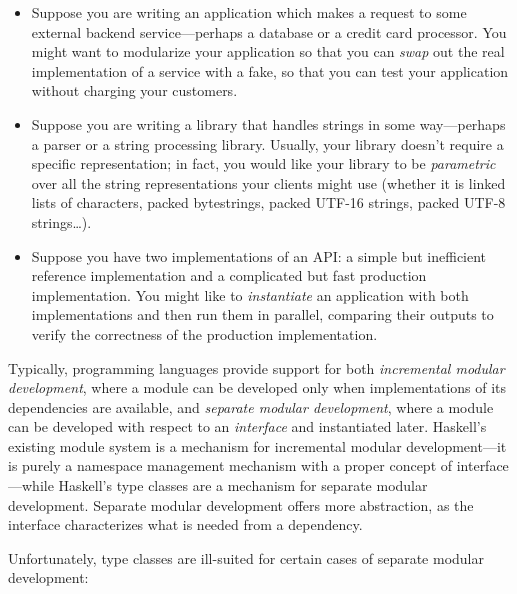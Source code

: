 \begin{itemize}
    \item Suppose you are writing an application which makes a request to
    some external backend service---perhaps a database or a credit card
    processor.  You might want to modularize your
    application so that you can \emph{swap} out the real implementation
    of a service with a fake, so that you can test your application without
    charging your customers.

    \item Suppose you are writing a library that handles strings in some
    way---perhaps a parser or a string processing library.  Usually, your
    library doesn't require a specific representation; in fact, you would
    like your library to be \emph{parametric} over all the string representations
    your clients might use (whether it is linked lists of
    characters, packed bytestrings, packed UTF-16 strings, packed UTF-8
    strings\ldots).

    \item Suppose you have two implementations of an API\@: a simple but
    inefficient reference implementation and a complicated but
    fast production implementation.  You might like to \emph{instantiate}
    an application with both implementations and then run them in
    parallel, comparing their outputs to verify the correctness of the
    production implementation.
\end{itemize}
%
Typically, programming languages provide support for both \emph{incremental
modular development}, where a module can be developed only when implementations
of its dependencies are available, and \emph{separate modular development},
where a module can be developed with respect to an \emph{interface}
and instantiated later.  Haskell's existing module system is a mechanism
for incremental modular development---it is purely a namespace management
mechanism with a proper concept of interface---while Haskell's type classes are a
mechanism for separate modular development.  Separate modular development
offers more abstraction, as the interface characterizes
what is needed from a dependency.

Unfortunately, type classes are ill-suited for certain cases of
separate modular development:

